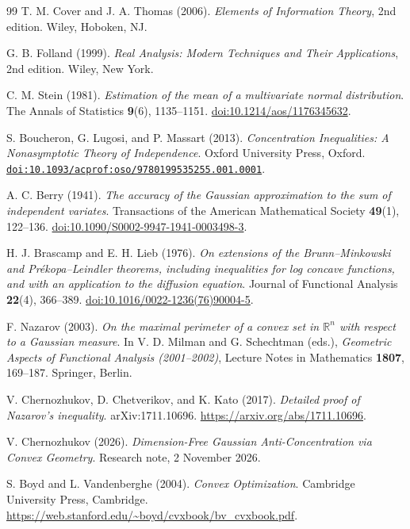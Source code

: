 \documentclass[11pt,letterpaper]{article}
\theoremstyle{remark}
\newcommand{\R}{\mathbb R}
\begin{document}
\begin{thebibliography}{99}
T. M. Cover and J. A. Thomas (2006).
\emph{Elements of Information Theory}, 2nd edition.
Wiley, Hoboken, NJ.

G. B. Folland (1999).
\emph{Real Analysis: Modern Techniques and Their Applications}, 2nd edition.
Wiley, New York.

C. M. Stein (1981).
\emph{Estimation of the mean of a multivariate normal distribution}.
The Annals of Statistics \textbf{9}(6), 1135--1151.
\href{https://doi.org/10.1214/aos/1176345632}{doi:10.1214/aos/1176345632}.

S. Boucheron, G. Lugosi, and P. Massart (2013).
\emph{Concentration Inequalities: A Nonasymptotic Theory of Independence}.
Oxford University Press, Oxford.
\href{https://doi.org/10.1093/acprof:oso/9780199535255.001.0001}{\nolinkurl{doi:10.1093/acprof:oso/9780199535255.001.0001}}.

A. C. Berry (1941).
\emph{The accuracy of the Gaussian approximation to the sum of independent variates}.
Transactions of the American Mathematical Society \textbf{49}(1), 122--136.
\href{https://doi.org/10.1090/S0002-9947-1941-0003498-3}{doi:10.1090/S0002-9947-1941-0003498-3}.

H. J. Brascamp and E. H. Lieb (1976).
\emph{On extensions of the Brunn--Minkowski and Pr\'ekopa--Leindler
theorems, including inequalities for log concave functions, and with
an application to the diffusion equation}.
Journal of Functional Analysis \textbf{22}(4), 366--389.
\href{https://doi.org/10.1016/0022-1236(76)90004-5}{doi:10.1016/0022-1236(76)90004-5}.

F. Nazarov (2003).
\emph{On the maximal perimeter of a convex set in \(\R^n\)
with respect to a Gaussian measure}.
In V. D. Milman and G. Schechtman (eds.),
\emph{Geometric Aspects of Functional Analysis (2001--2002)},
Lecture Notes in Mathematics \textbf{1807}, 169--187.
Springer, Berlin.

V. Chernozhukov, D. Chetverikov, and K. Kato (2017).
\emph{Detailed proof of Nazarov's inequality}.
arXiv:1711.10696.
\url{https://arxiv.org/abs/1711.10696}.

V. Chernozhukov (2026).
\emph{Dimension-Free Gaussian Anti-Concentration via Convex Geometry}.
Research note, 2 November 2026.

S. Boyd and L. Vandenberghe (2004).
\emph{Convex Optimization}.
Cambridge University Press, Cambridge.
\url{https://web.stanford.edu/~boyd/cvxbook/bv_cvxbook.pdf}.


\end{thebibliography}
\end{document}
